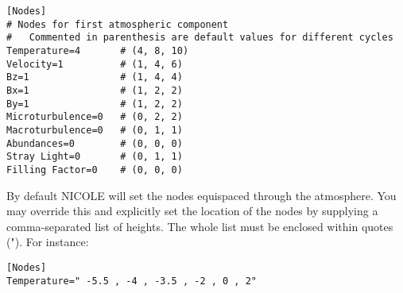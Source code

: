 \begin{verbatim}
[Nodes]
# Nodes for first atmospheric component
#   Commented in parenthesis are default values for different cycles
Temperature=4       # (4, 8, 10)
Velocity=1          # (1, 4, 6)
Bz=1                # (1, 4, 4)
Bx=1                # (1, 2, 2)
By=1                # (1, 2, 2)
Microturbulence=0   # (0, 2, 2)
Macroturbulence=0   # (0, 1, 1)
Abundances=0        # (0, 0, 0)
Stray Light=0       # (0, 1, 1)
Filling Factor=0    # (0, 0, 0)
\end{verbatim}

By default NICOLE will set the nodes equispaced through the
atmosphere. You may override this and explicitly set the location of
the nodes by supplying a comma-separated list of heights. The whole list must be enclosed within quotes ("). For instance:
\begin{verbatim}
[Nodes]
Temperature=" -5.5 , -4 , -3.5 , -2 , 0 , 2"
\end{verbatim}

